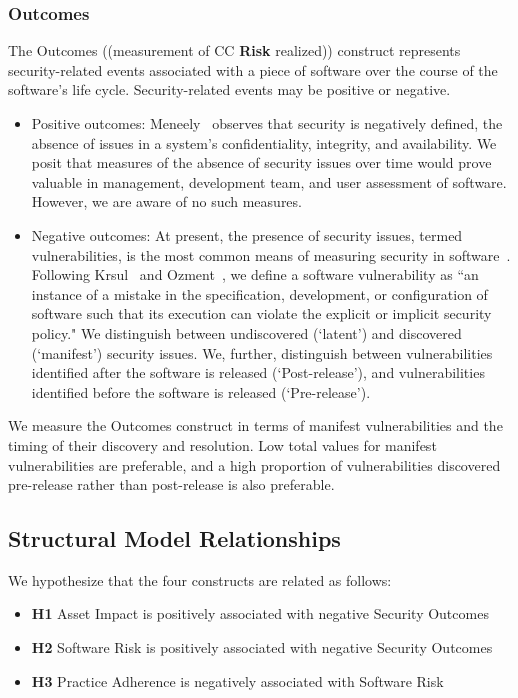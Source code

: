 \subsubsection{Outcomes}
\label{sec:model_contruct_outcome}
The Outcomes  ((measurement of CC \textbf{Risk} realized)) construct represents security-related events associated with a piece of software over the course of the software's life cycle. Security-related events may be positive or negative. 
\begin{itemize}
	\item Positive outcomes: Meneely~\cite{meneely2016security} observes that security is negatively defined, the absence of issues in a system's confidentiality, integrity, and availability. We posit that measures of the absence of security issues over time would prove valuable in management, development team, and user assessment of software. However, we are aware of no such measures.
	\item Negative outcomes: At present, the presence of security issues, termed vulnerabilities, is the most common means of measuring security in software~\cite{morrison2014mapping}. Following Krsul~\cite{krsul1998software} and Ozment~\cite{ozment2007vulnerability}, we define a software vulnerability as “an instance of a mistake in the specification, development, or configuration of software such that its execution can violate the explicit or implicit security policy." We distinguish between undiscovered (`latent') and discovered (`manifest') security issues. We, further, distinguish between vulnerabilities identified after the software is released (`Post-release'), and vulnerabilities identified before the software is released (`Pre-release'). 
\end{itemize} 

We measure the Outcomes construct in terms of manifest vulnerabilities and the timing of their discovery and resolution. Low total values for manifest vulnerabilities are preferable, and a high proportion of vulnerabilities discovered pre-release rather than post-release is also preferable. 

\subsection{Structural Model Relationships}
We hypothesize that the four constructs are related as follows:
\begin{itemize}
	\item \textbf{H1} Asset Impact is positively associated with negative Security Outcomes
	\item \textbf{H2} Software Risk is positively associated with negative Security Outcomes
	\item \textbf{H3} Practice Adherence is negatively associated with Software Risk 	
\end{itemize}

